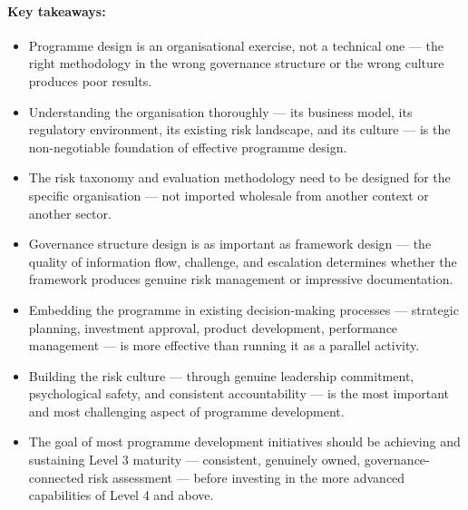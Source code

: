 \paragraph{Key takeaways:}
\begin{itemize}
  \item{Programme design is an organisational exercise, not a technical one — the right methodology in the wrong governance structure or the wrong culture produces poor results.}
  \item{Understanding the organisation thoroughly — its business model, its regulatory environment, its existing risk landscape, and its culture — is the non-negotiable foundation of effective programme design.}
  \item{The risk taxonomy and evaluation methodology need to be designed for the specific organisation — not imported wholesale from another context or another sector.}
  \item{Governance structure design is as important as framework design — the quality of information flow, challenge, and escalation determines whether the framework produces genuine risk management or impressive documentation.}
  \item{Embedding the programme in existing decision-making processes — strategic planning, investment approval, product development, performance management — is more effective than running it as a parallel activity.}
  \item{Building the risk culture — through genuine leadership commitment, psychological safety, and consistent accountability — is the most important and most challenging aspect of programme development.}
  \item{The goal of most programme development initiatives should be achieving and sustaining Level 3 maturity — consistent, genuinely owned, governance-connected risk assessment — before investing in the more advanced capabilities of Level 4 and above.}
\end{itemize}

